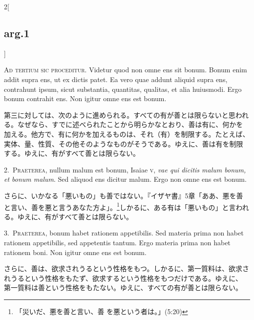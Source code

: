 \documentclass[paper=a4paper,fontsize=10pt,jafontsize=9pt,titlepage]{jlreq}
\begin{document}
\begin{paracol}{2}[\subsection{arg.1}]

{\huge A}{\scshape d tertium sic proceditur}. Videtur quod non omne ens
 sit bonum. Bonum enim addit supra ens, ut ex dictis patet. Ea vero quae
 addunt aliquid supra ens, contrahunt ipsum, sicut substantia,
 quantitas, qualitas, et alia huiusmodi. Ergo bonum contrahit ens. Non
 igitur omne ens est bonum.

\switchcolumn

第三に対しては、次のように進められる。すべての有が善とは限らないと思われ
 る。なぜなら、すでに述べられたことから明らかなとおり、善は有に、何かを
 加える。他方で、有に何かを加えるものは、それ（有）を制限する。たとえば、
 実体、量、性質、その他そのようなものがそうである。ゆえに、善は有を制限
 する。ゆえに、有がすべて善とは限らない。


2.~{\scshape Praeterea}, nullum malum est bonum, Isaiae {\scshape v},
 {\itshape vae qui dicitis malum bonum, et bonum malum}. Sed aliquod ens
 dicitur malum. Ergo non omne ens est bonum.

\switchcolumn

さらに、いかなる「悪いもの」も善ではない。『イザヤ書』5章「ああ、悪を善
 と言い、善を悪と言うあなた方よ」。\footnote{「災いだ、悪を善と言い、善
 を悪という者は。」(5:20)}しかるに、ある有は「悪いもの」と言われ
 る。ゆえに、有がすべて善とは限らない。


3.~{\scshape Praeterea}, bonum habet rationem appetibilis. Sed materia
 prima non habet rationem appetibilis, sed appetentis tantum. Ergo
 materia prima non habet rationem boni. Non igitur omne ens est bonum.

\switchcolumn

さらに、善は、欲求されうるという性格をもつ。しかるに、第一質料は、欲求さ
 れうるという性格をもたず、欲求するという性格をもつだけである。ゆえに、
 第一質料は善という性格をもたない。ゆえに、すべての有が善とは限らない。


\end{paracol}
\end{document}
